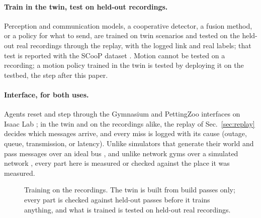 \paragraph{Train in the twin, test on held-out recordings.} Perception
and communication models, a cooperative detector, a fusion method, or a
policy for what to send, are trained on twin scenarios and tested on the
held-out real recordings through the replay, with the logged link and
real labels; that test is reported with the SCooP dataset
\cite{scoop_dataset}. Motion cannot be tested on a recording; a motion
policy trained in the twin is tested by deploying it on the testbed,
the step after this paper.

\paragraph{Interface, for both uses.} Agents reset and step through the Gymnasium and
PettingZoo interfaces \cite{gymnasium,pettingzoo} on Isaac Lab
\cite{orbit}; in the twin and on the recordings alike, the replay of
Sec.~\ref{sec:replay} decides which
messages arrive, and every miss is logged with its cause (outage,
queue, transmission, or latency). Unlike simulators that generate their
world and pass messages over an ideal bus \cite{lingjing}, and unlike
network gyms over a simulated network \cite{ns3gym}, every part here is
measured or checked against the place it was measured.

\begin{figure}[t]
\centering
{}
\caption{Training on the recordings. The twin is built from build passes only; every
part is checked against held-out passes before it trains anything, and
what is trained is tested on held-out real recordings.}
\label{fig:gym}
\end{figure}
